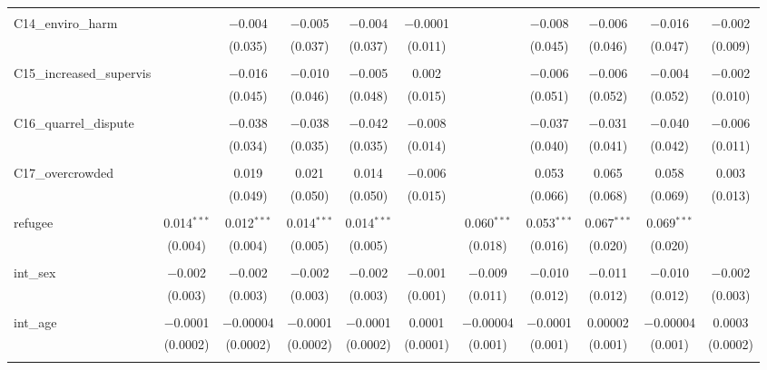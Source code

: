 \begin{table}[H]
\begin{tabular}{@{\extracolsep{4pt}}lcccccccccc}
  & & & & & & & & & & \\ 
 C14\_enviro\_harm &  & $-$0.004 & $-$0.005 & $-$0.004 & $-$0.0001 &  & $-$0.008 & $-$0.006 & $-$0.016 & $-$0.002 \\ 
  &  & (0.035) & (0.037) & (0.037) & (0.011) &  & (0.045) & (0.046) & (0.047) & (0.009) \\ 
  & & & & & & & & & & \\ 
 C15\_increased\_supervis &  & $-$0.016 & $-$0.010 & $-$0.005 & 0.002 &  & $-$0.006 & $-$0.006 & $-$0.004 & $-$0.002 \\ 
  &  & (0.045) & (0.046) & (0.048) & (0.015) &  & (0.051) & (0.052) & (0.052) & (0.010) \\ 
  & & & & & & & & & & \\ 
 C16\_quarrel\_dispute &  & $-$0.038 & $-$0.038 & $-$0.042 & $-$0.008 &  & $-$0.037 & $-$0.031 & $-$0.040 & $-$0.006 \\ 
  &  & (0.034) & (0.035) & (0.035) & (0.014) &  & (0.040) & (0.041) & (0.042) & (0.011) \\ 
  & & & & & & & & & & \\ 
 C17\_overcrowded &  & 0.019 & 0.021 & 0.014 & $-$0.006 &  & 0.053 & 0.065 & 0.058 & 0.003 \\ 
  &  & (0.049) & (0.050) & (0.050) & (0.015) &  & (0.066) & (0.068) & (0.069) & (0.013) \\ 
  & & & & & & & & & & \\ 
 refugee & 0.014$^{***}$ & 0.012$^{***}$ & 0.014$^{***}$ & 0.014$^{***}$ &  & 0.060$^{***}$ & 0.053$^{***}$ & 0.067$^{***}$ & 0.069$^{***}$ &  \\ 
  & (0.004) & (0.004) & (0.005) & (0.005) &  & (0.018) & (0.016) & (0.020) & (0.020) &  \\ 
  & & & & & & & & & & \\ 
 int\_sex & $-$0.002 & $-$0.002 & $-$0.002 & $-$0.002 & $-$0.001 & $-$0.009 & $-$0.010 & $-$0.011 & $-$0.010 & $-$0.002 \\ 
  & (0.003) & (0.003) & (0.003) & (0.003) & (0.001) & (0.011) & (0.012) & (0.012) & (0.012) & (0.003) \\ 
  & & & & & & & & & & \\ 
 int\_age & $-$0.0001 & $-$0.00004 & $-$0.0001 & $-$0.0001 & 0.0001 & $-$0.00004 & $-$0.0001 & 0.00002 & $-$0.00004 & 0.0003 \\ 
  & (0.0002) & (0.0002) & (0.0002) & (0.0002) & (0.0001) & (0.001) & (0.001) & (0.001) & (0.001) & (0.0002) \\ 
  & & & & & & & & & & \\ 

\end{tabular}
\end{table}
